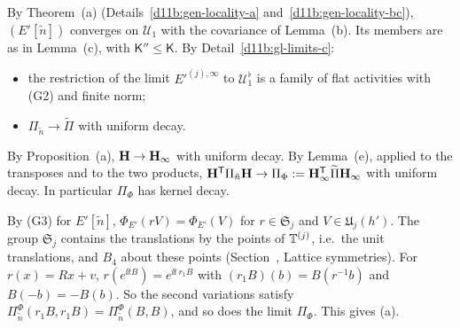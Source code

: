 \begin{step}[Convergence]
By Theorem~(a) (Details~\ref{d11b:gen-locality-a} and~\ref{d11b:gen-locality-bc}), $(E'[\tilde n])$ converges on $\mathcal U_1$ with the covariance of Lemma~(b). Its members are as in Lemma~(c), with $\mathsf K''\le\mathsf K$. By Detail~\ref{d11b:gl-limits-c}:
\begin{itemize}
\item the restriction of the limit $E'^{(j),\infty}$ to $\mathcal U^\flat_1$ is a family of flat activities with (G2) and finite norm;
\item $\Pi_{\tilde n}\to\widetilde\Pi$ with uniform decay.
\end{itemize}
By Proposition~(a), $\mathbf H\to\mathbf H_\infty$ with uniform decay. By Lemma~(e), applied to the transposes and to the two products, $\mathbf H^{\sf T}\Pi_{\tilde n}\mathbf H\to\Pi_\Phi:=\mathbf H_\infty^{\sf T}\widetilde\Pi\mathbf H_\infty$ with uniform decay. In particular $\Pi_\Phi$ has kernel decay.
\end{step}

\begin{step}[Symmetry]
By (G3) for $E'[\tilde n]$, $\Phi_{E'}(rV)=\Phi_{E'}(V)$ for $r\in\mathfrak S_j$ and $V\in\mathfrak U_j(h')$. The group $\mathfrak S_j$ contains the translations by the points of $\mathbb T^{(j)}$, i.e.\ the unit translations, and $B_4$ about these points (Section~, Lattice symmetries). For $r(x)=Rx+v$, $r(e^{\ii tB})=e^{\ii t\,r_1B}$ with $(r_1B)(b)=B(r^{-1}b)$ and $B(-b)=-B(b)$. So the second variations satisfy $\Pi^\Phi_{\tilde n}(r_1B,r_1B)=\Pi^\Phi_{\tilde n}(B,B)$, and so does the limit $\Pi_\Phi$. This gives (a).
\end{step}

